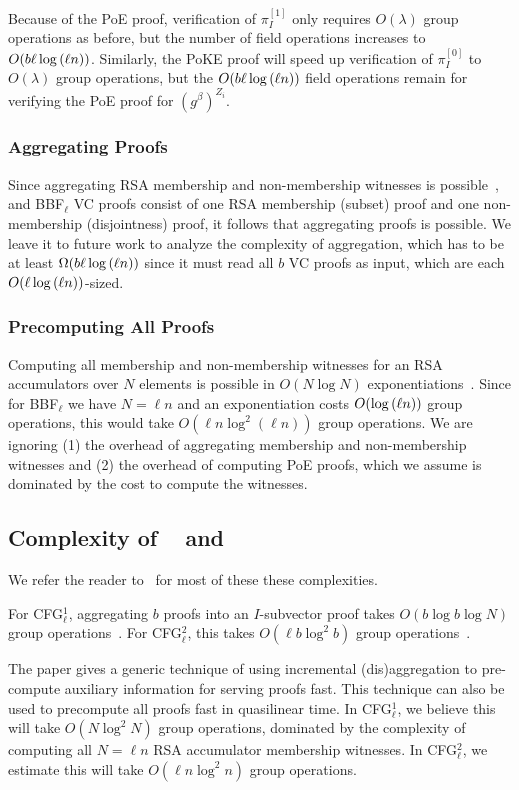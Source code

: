 Because of the PoE proof, verification of $\pi_I^{[1]}$ only requires $O(\lambda)$ group operations as before, but the number of field operations increases to $O(b\ell\log{(\ell n)})$.
Similarly, the PoKE proof will speed up verification of $\pi_I^{[0]}$ to $O(\lambda)$ group operations, but the $O(b\ell\log{(\ell n)})$ field operations remain for verifying the PoE proof for $\left(g^{\beta}\right)^{Z_i}$.

\subsubsection{Aggregating Proofs}
Since aggregating RSA membership and non-membership witnesses is possible~\cite{BBF18}, and BBF$_\ell$ VC proofs consist of one RSA membership (subset) proof and one non-membership (disjointness) proof, it follows that aggregating proofs is possible.
We leave it to future work to analyze the complexity of aggregation, which has to be at least $\Omega(b\ell\log{(\ell n)})$ since it must read all $b$ VC proofs as input, which are each $O(\ell\log{(\ell n)})$-sized.

\subsubsection{Precomputing All Proofs}
Computing all membership and non-membership witnesses for an RSA accumulators over $N$ elements is possible in $O(N\log{N})$ exponentiations~\cite{BBF18,SSY01}.
Since for BBF$_\ell$ we have $N=\ell n$ and an exponentiation costs $O(\log{(\ell n)})$ group operations, this would take $O(\ell n \log^2{(\ell n)})$ group operations.
We are ignoring (1) the overhead of aggregating membership and non-membership witnesses and (2) the overhead of computing PoE proofs, which we assume is dominated by the cost to compute the witnesses.

\subsection{Complexity of \cfgOne~\cite{CFG+20} and \cfgTwo~\cite{CF13,LM19,CFG+20}}

We refer the reader to~\cite[Table 1, pg. 35]{CFG+20} for most of these these complexities.

For CFG$_{\ell}^1$, aggregating $b$ proofs into an $I$-subvector proof takes $O(b\log{b}\log{N})$ group operations~\cite[Sec 5.1, pg. 23]{CFG+20}.
For CFG$_{\ell}^2$, this takes $O(\ell b\log^2{b})$ group operations~\cite[Sec 5.2, pg. 32]{CFG+20}.

The paper gives a generic technique of using incremental (dis)aggregation to pre-compute auxiliary information for serving proofs fast.
This technique can also be used to precompute all proofs fast in quasilinear time.
In CFG$_\ell^{1}$, we believe this will take $O(N\log^2{N})$ group operations, dominated by the complexity of computing all $N=\ell n$ RSA accumulator membership witnesses.
In CFG$_\ell^{2}$, we estimate this will take $O(\ell n\log^2{n})$ group operations.